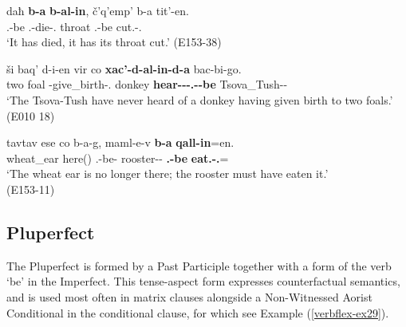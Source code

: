 \begin{exe}
	\ex\label{verbflex-ex28}
	\begin{xlist}
		
		
			\ex\label{verbflex-ex28a}
			\gll daħ \textbf{b-a} \textbf{b-al-in}, č'q'emp' b-a tit'-en. \\
			{\Pv} {\B}.{\Sg}-be {\B}.{\Sg}-die-{\Ptcp}.{\Pst} throat {\B}.{\Sg}-be cut.{\Pfv}-{\Ptcp}.{\Pst} \\
			\trans `It has died, it has its throat cut.'
			\hfill (E153-38)
		
		
		
			\ex\label{verbflex-ex28c}
			\gll ši baq' d-i-en vir co \textbf{xac'-d-al-in-d-a} bac-bi-go.  \\
			two foal {\D}-give\_birth-{\Ptcp}.{\Pst} donkey {\Neg} \textbf{hear-{\D}-{\Intr}-{\Ptcp}.{\Pst}-{\D}-be} Tsova\_Tush-{\Pl}-{\Adess} \\
			\trans `The Tsova-Tush have never heard of a donkey having given birth to two foals.'
			\hfill (E010 18)
		
		
		
			\ex\label{verbflex-ex28d}
			\gll tavtav ese co b-a-g, maml-e-v \textbf{b-a} \textbf{qall-in}=en. \\
			wheat\_ear here({\Ess}) {\Neg} {\B}.{\Sg}-be-{\Iam} rooster-{\Obl}-{\Erg} \textbf{{\B}.{\Sg}-be} \textbf{eat.{\Pfv}-{\Ptcp}.{\Pst}}={\Quot}\\
			\trans `The wheat ear is no longer there; the rooster must have eaten it.' \\
			\hfill (E153-11)
		
	\end{xlist}
\end{exe}



\subsection{Pluperfect}

The Pluperfect is formed by a Past Participle together with a form of the verb `be' in the Imperfect. This tense-aspect form expresses counterfactual semantics, and is used most often in matrix clauses alongside a Non-Witnessed Aorist Conditional in the conditional clause, for which see Example (\ref{verbflex-ex29}).

